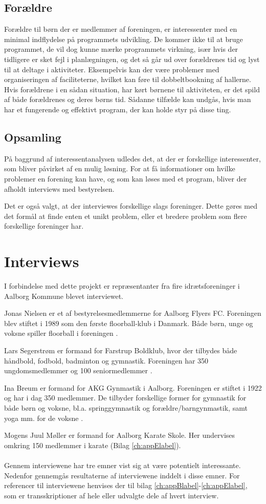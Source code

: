 \subsection*{Forældre}
Forældre til børn der er medlemmer af foreningen, er interessenter med en minimal indflydelse på programmets udvikling. De kommer ikke til at bruge programmet, de vil dog kunne mærke programmets virkning, især hvis der tidligere er sket fejl i planlægningen, og det så går ud over forældrenes tid og lyst til at deltage i aktiviteter. Eksempelvis kan der være problemer med organiseringen af faciliteterne, hvilket kan føre til dobbeltbookning af hallerne. Hvis forældrene i en sådan situation, har kørt børnene til aktiviteten, er det spild af både forældrenes og deres børns tid. Sådanne tilfælde kan undgås, hvis man har et fungerende og effektivt program, der kan holde styr på disse ting.

\subsection*{Opsamling}
På baggrund af interessentanalysen udledes det, at der er forskellige interessenter, som bliver påvirket af en mulig løsning. For at få informationer om hvilke problemer en forening kan have, og som kan løses med et program, bliver der afholdt interviews med bestyrelsen. 
\par
Det er også valgt, at der interviewes forskellige slags foreninger. Dette gøres med det formål at finde enten et unikt problem, eller et bredere problem som flere forskellige foreninger har.

\section{Interviews}\label{Interviews}
I forbindelse med dette projekt er repræsentanter fra fire idrætsforeninger i Aalborg Kommune blevet interviewet. 
\par
Jonas Nielsen er et af bestyrelsesmedlemmerne for Aalborg Flyers FC. Foreningen blev stiftet i 1989 som den første floorball-klub i Danmark. Både børn, unge og voksne spiller floorball i foreningen \citep{AalborgFlyers}.
\par
Lars Segerstrøm er formand for Farstrup Boldklub, hvor der tilbydes både håndbold, fodbold, badminton og gymnastik. Foreningen har 350 ungdomsmedlemmer og 100 seniormedlemmer \citep{Farstrup}.
\par
Ina Breum er formand for AKG Gynmastik i Aalborg. Foreningen er stiftet i 1922 og har i dag 350 medlemmer. De tilbyder forskellige former for gymnastik for både børn og voksne, bl.a. springgymnastik og forældre/barngynmastik, samt yoga mm. for de voksne \citep{AKG}.
\par
Mogens Juul Møller er formand for Aalborg Karate Skole. Her undervises omkring 150 medlemmer i karate (Bilag \ref{ch:appElabel}).
\\\\
Gennem interviewene har tre emner vist sig at være potentielt interessante. Nedenfor gennemgås resultaterne af interviewene inddelt i disse emner. For referencer til interviewene henvises der til bilag \ref{ch:appBlabel}-\ref{ch:appElabel}, som er transskriptioner af hele eller udvalgte dele af hvert interview.

